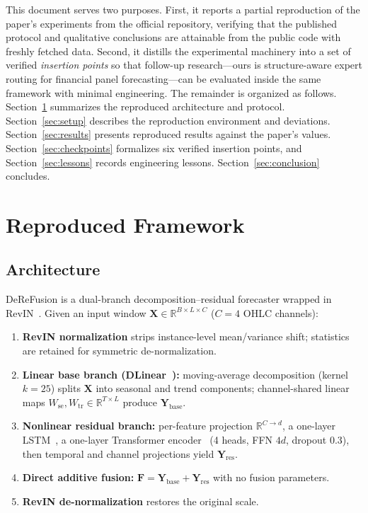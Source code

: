 \documentclass[conference]{IEEEtran}
\begin{document}
This document serves two purposes. First, it reports a partial reproduction
of the paper's experiments from the official repository, verifying that the
published protocol and qualitative conclusions are attainable from the
public code with freshly fetched data. Second, it distills the experimental
machinery into a set of verified \emph{insertion points} so that follow-up
research---ours is structure-aware expert routing for financial panel
forecasting---can be evaluated inside the same framework with minimal
engineering. The remainder is organized as follows.
Section~\ref{sec:method} summarizes the reproduced architecture and
protocol. Section~\ref{sec:setup} describes the reproduction environment
and deviations. Section~\ref{sec:results} presents reproduced results
against the paper's values. Section~\ref{sec:checkpoints} formalizes six
verified insertion points, and Section~\ref{sec:lessons} records
engineering lessons. Section~\ref{sec:conclusion} concludes.

\section{Reproduced Framework}
\label{sec:method}

\subsection{Architecture}

DeReFusion is a dual-branch decomposition--residual forecaster wrapped in
RevIN~\cite{kim2022revin}. Given an input window
$\mathbf{X}\in\mathbb{R}^{B\times L\times C}$ ($C=4$ OHLC channels):

\begin{enumerate}
  \item \textbf{RevIN normalization} strips instance-level mean/variance
        shift; statistics are retained for symmetric de-normalization.
  \item \textbf{Linear base branch (DLinear~\cite{zeng2023dlinear}):}
        moving-average decomposition (kernel $k{=}25$) splits $\mathbf{X}$
        into seasonal and trend components; channel-shared linear maps
        $W_{\mathrm{se}}, W_{\mathrm{tr}}\in\mathbb{R}^{T\times L}$ produce
        $\mathbf{Y}_{\mathrm{base}}$.
  \item \textbf{Nonlinear residual branch:} per-feature projection
        $\mathbb{R}^{C\to d}$, a one-layer LSTM~\cite{hochreiter1997lstm},
        a one-layer Transformer encoder~\cite{vaswani2017attention}
        (4 heads, FFN $4d$, dropout 0.3), then temporal and channel
        projections yield $\mathbf{Y}_{\mathrm{res}}$.
  \item \textbf{Direct additive fusion:}
        $\mathbf{F}=\mathbf{Y}_{\mathrm{base}}+\mathbf{Y}_{\mathrm{res}}$
        with no fusion parameters.
  \item \textbf{RevIN de-normalization} restores the original scale.
\end{enumerate}
\end{document}

